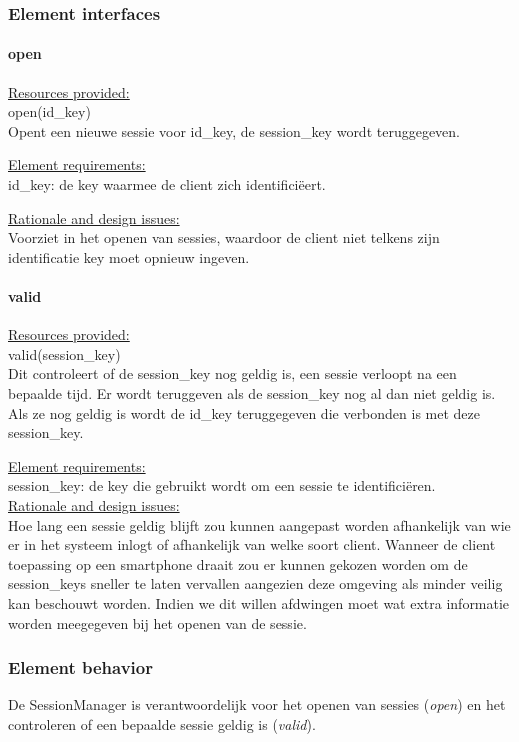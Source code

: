 \documentclass[a4paper,10pt]{article}
\begin{document}
\subsubsection{Element interfaces} 

\paragraph{open}
\underline{Resources provided:}\\
open(id\_key)\\
Opent een nieuwe sessie voor id\_key, de session\_key wordt teruggegeven.

\underline{Element requirements:}\\
id\_key: de key waarmee de client zich identifici\"{e}ert.

\underline{Rationale and design issues:}\\
Voorziet in het openen van sessies, waardoor de client niet telkens zijn identificatie key moet opnieuw ingeven.

\paragraph{valid}
\underline{Resources provided:}\\
valid(session\_key)\\
Dit controleert of de session\_key nog geldig is, een sessie verloopt na een bepaalde tijd.  Er wordt teruggeven als de session\_key nog al dan niet geldig is.  Als ze nog geldig is wordt de id\_key teruggegeven die verbonden is met deze session\_key.

\underline{Element requirements:}\\
session\_key: de key die gebruikt wordt om een sessie te identifici\"{e}ren.\\

\underline{Rationale and design issues:}\\
Hoe lang een sessie geldig blijft zou kunnen aangepast worden afhankelijk van wie er in het systeem inlogt of afhankelijk van welke soort client.  Wanneer de client toepassing op een smartphone draait zou er kunnen gekozen worden om de session\_keys sneller te laten vervallen aangezien deze omgeving als minder veilig kan beschouwt worden.  Indien we dit willen afdwingen moet wat extra informatie worden meegegeven bij het openen van de sessie.

\subsubsection{Element behavior}
De SessionManager is verantwoordelijk voor het openen van sessies (\textit{open}) en het controleren of een bepaalde sessie geldig is (\textit{valid}).
\end{document}
